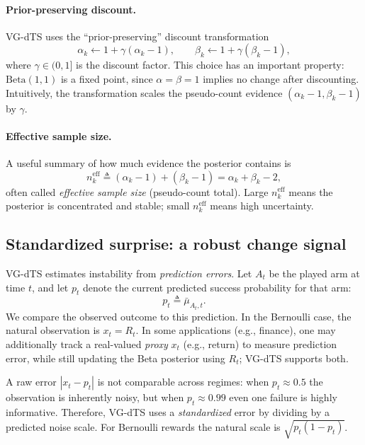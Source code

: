 \paragraph{Prior-preserving discount.}
VG-dTS uses the ``prior-preserving'' discount transformation
\begin{equation}
\alpha_k \leftarrow 1+\gamma(\alpha_k-1),\qquad
\beta_k \leftarrow 1+\gamma(\beta_k-1),
\label{eq:apx_discount}
\end{equation}
where $\gamma\in(0,1]$ is the discount factor. This choice has an important property:
$\mathrm{Beta}(1,1)$ is a fixed point, since $\alpha=\beta=1$ implies no change after discounting.
Intuitively, the transformation scales the pseudo-count evidence $(\alpha_k-1,\beta_k-1)$ by $\gamma$.

\paragraph{Effective sample size.}
A useful summary of how much evidence the posterior contains is
\begin{equation}
n^{\mathrm{eff}}_k \triangleq (\alpha_k-1)+(\beta_k-1)=\alpha_k+\beta_k-2,
\label{eq:apx_neff}
\end{equation}
often called \emph{effective sample size} (pseudo-count total).
Large $n^{\mathrm{eff}}_k$ means the posterior is concentrated and stable; small $n^{\mathrm{eff}}_k$ means high uncertainty.

\subsection{Standardized surprise: a robust change signal}
VG-dTS estimates instability from \emph{prediction errors}.
Let $A_t$ be the played arm at time $t$, and let $p_t$ denote the current predicted success probability for that arm:
\[
p_t \triangleq \bar{\mu}_{A_t,t}.
\]
We compare the observed outcome to this prediction. In the Bernoulli case, the natural observation is $x_t=R_t$.
In some applications (e.g., finance), one may additionally track a real-valued \emph{proxy} $x_t$ (e.g., return) to measure prediction error, while still updating the Beta posterior using $R_t$; VG-dTS supports both.

A raw error $|x_t-p_t|$ is not comparable across regimes: when $p_t\approx 0.5$ the observation is inherently noisy, but when $p_t\approx 0.99$ even one failure is highly informative.
Therefore, VG-dTS uses a \emph{standardized} error by dividing by a predicted noise scale.
For Bernoulli rewards the natural scale is $\sqrt{p_t(1-p_t)}$.

